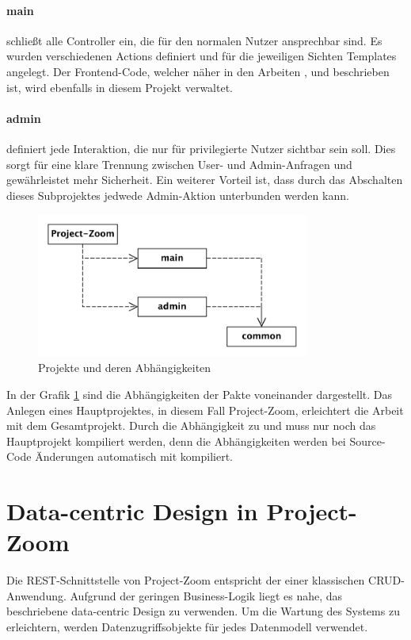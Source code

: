 \paragraph{main} schließt alle Controller ein, die für den normalen Nutzer ansprechbar sind. Es wurden verschiedenen Actions definiert und für die jeweiligen Sichten Templates angelegt. Der Frontend-Code, welcher näher in den Arbeiten \cite{bp-norman}, \cite{bp-tomh} und \cite{bp-anita} beschrieben ist, wird ebenfalls in diesem Projekt verwaltet.

\paragraph{admin} definiert jede Interaktion, die nur 
für privilegierte Nutzer sichtbar sein soll. Dies sorgt für eine klare Trennung zwischen User- und Admin-Anfragen und gewährleistet mehr Sicherheit. Ein weiterer Vorteil ist, dass durch das Abschalten dieses Subprojektes jedwede Admin-Aktion unterbunden werden kann.

\begin{figure}[h]  
  \centering     
  \includegraphics[width=0.8\textwidth]{img/projekte.pdf}  
   \caption{Projekte und deren Abhängigkeiten}   
  \label{fig:projects} 
\end{figure}

\FloatBarrier
In der Grafik \ref{fig:projects} sind die Abhängigkeiten der Pakte voneinander dargestellt. Das Anlegen eines Hauptprojektes, in diesem Fall Project-Zoom, erleichtert die Arbeit mit dem Gesamtprojekt. Durch die Abhängigkeit zu  und  muss nur noch das Hauptprojekt kompiliert werden, denn die Abhängigkeiten werden bei Source-Code Änderungen automatisch mit kompiliert.


\section{Data-centric Design in Project-Zoom}
\label{sec:umsetzung_dcd}
Die REST-Schnittstelle von Project-Zoom entspricht der einer klassischen CRUD-Anwendung. Aufgrund der geringen Business-Logik liegt es nahe, das beschriebene data-centric Design zu verwenden. Um die Wartung des Systems zu erleichtern, werden Datenzugriffsobjekte für jedes Datenmodell verwendet.

